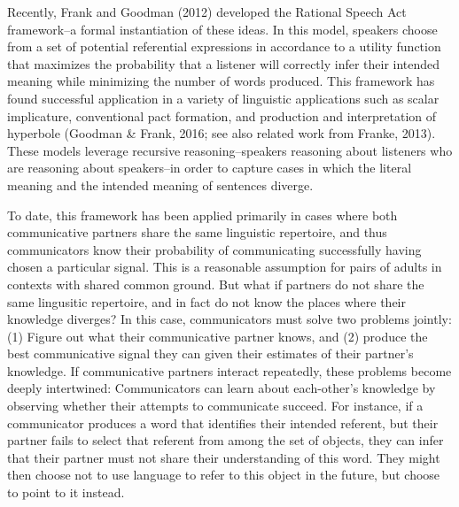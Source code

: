 \documentclass[english,,man,floatsintext]{apa6}
\begin{document}
Recently, Frank and Goodman (2012) developed the Rational Speech Act framework--a formal instantiation of these ideas. In this model, speakers choose from a set of potential referential expressions in accordance to a utility function that maximizes the probability that a listener will correctly infer their intended meaning while minimizing the number of words produced. This framework has found successful application in a variety of linguistic applications such as scalar implicature, conventional pact formation, and production and interpretation of hyperbole (Goodman \& Frank, 2016; see also related work from Franke, 2013). These models leverage recursive reasoning--speakers reasoning about listeners who are reasoning about speakers--in order to capture cases in which the literal meaning and the intended meaning of sentences diverge.

To date, this framework has been applied primarily in cases where both communicative partners share the same linguistic repertoire, and thus communicators know their probability of communicating successfully having chosen a particular signal. This is a reasonable assumption for pairs of adults in contexts with shared common ground. But what if partners do not share the same lingusitic repertoire, and in fact do not know the places where their knowledge diverges? In this case, communicators must solve two problems jointly: (1) Figure out what their communicative partner knows, and (2) produce the best communicative signal they can given their estimates of their partner's knowledge. If communicative partners interact repeatedly, these problems become deeply intertwined: Communicators can learn about each-other's knowledge by observing whether their attempts to communicate succeed. For instance, if a communicator produces a word that identifies their intended referent, but their partner fails to select that referent from among the set of objects, they can infer that their partner must not share their understanding of this word. They might then choose not to use language to refer to this object in the future, but choose to point to it instead.
\end{document}
